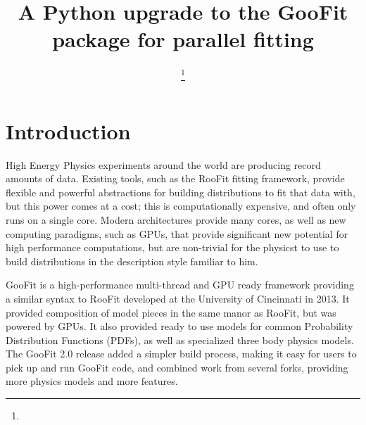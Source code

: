 \documentclass{webofc}
\begin{document}
%
\title{A Python upgrade to the GooFit package for parallel fitting}

\author{
        \fnsep\thanks{}
        \and
        \and 
        \and
        \and 
        \and 
}        %


%
\maketitle
%
\section{Introduction}
\label{intro}
High Energy Physics experiments around the world are producing record amounts of data. Existing tools, such as the RooFit fitting framework, provide flexible and powerful abstractions for building distributions to fit that data with, but this power comes at a cost; this is computationally expensive, and often only runs on a single core. Modern architectures provide many cores, as well as new computing paradigms, such as GPUs, that provide significant new potential for high performance computations, but are non-trivial for the physicst to use to build distributions in the description style familiar to him.

GooFit is a high-performance multi-thread and GPU ready framework providing a similar syntax to RooFit developed at the University of Cincinnati in 2013.  It provided composition of model pieces in the same manor as RooFit, but was powered by GPUs. It also provided ready to use models for common Probability Distribution Functions (PDFs), as well as specialized three body physics models. The GooFit 2.0 release  added a simpler build process, making it easy for users to pick up and run GooFit code, and combined work from several forks, providing more physics models and more features.
\end{document}
